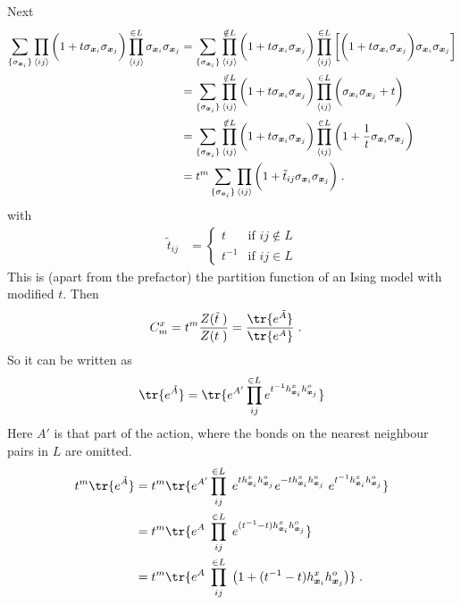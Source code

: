 Next
%
\begin{align*}
\sum_{\{\sigma_{\boldsymbol x_{i}} \}}
\prod_{\langle ij \rangle} \bigg( 1+ t \sigma_{\boldsymbol x_{i}} \sigma_{\boldsymbol x_{j}} \bigg)
\prod_{\langle ij \rangle}^{\in L}\sigma_{\boldsymbol x_{i}} \sigma_{\boldsymbol x_{j}}
&=\sum_{\{\sigma_{\boldsymbol x_{i}} \}}
\prod_{\langle ij \rangle}^{\notin L} \bigg( 1+ t \sigma_{\boldsymbol x_{i}} \sigma_{\boldsymbol x_{j}} \bigg)
\prod_{\langle ij \rangle}^{\in L}\bigg[\bigg( 1+ t \sigma_{\boldsymbol x_{i}} \sigma_{\boldsymbol x_{j}} \bigg)\sigma_{\boldsymbol x_{i}} \sigma_{\boldsymbol x_{j}}\bigg]\\
&=\sum_{\{\sigma_{\boldsymbol x_{i}} \}}
\prod_{\langle ij \rangle}^{\notin L} \bigg( 1+ t \sigma_{\boldsymbol x_{i}} \sigma_{\boldsymbol x_{j}} \bigg)
\prod_{\langle ij \rangle}^{\in L}\bigg( \sigma_{\boldsymbol x_{i}} \sigma_{\boldsymbol x_{j}} + t \bigg)\\
&=\sum_{\{\sigma_{\boldsymbol x_{i}} \}}
\prod_{\langle ij \rangle}^{\notin L}\bigg( 1+ t \sigma_{\boldsymbol x_{i}} \sigma_{\boldsymbol x_{j}} \bigg)
\prod_{\langle ij \rangle}^{\in L}\bigg(1 + \frac{1}{t} \sigma_{\boldsymbol x_{i}} \sigma_{\boldsymbol x_{j}}  \bigg)\\
&=t^{m}\sum_{\{\sigma_{\boldsymbol x_{i}} \}}
\prod_{\langle ij \rangle}\bigg( 1+ \tilde t_{ij} \sigma_{\boldsymbol x_{i}} \sigma_{\boldsymbol x_{j}} \bigg)\;.
\end{align*}
%
with
%
\begin{align*}
\tilde t_{ij}&=
\begin{cases}
	t&\text{if }  ij\notin L\\
		t^{-1}&\text{if }  ij\in L
\end{cases}
\end{align*}
%
This is (apart from the prefactor) the partition function of an Ising model with modified
$t$. Then
%
\begin{align*}
C^{x}_{m} &= t^{m} \frac{Z(\tilde t\;)}{Z(t\;)}
= \frac{\tr{ e^{\tilde A}}}{\tr{ e^{A}}}\;.
\end{align*}
%
So it can be written as
%
\begin{align*}
\tr{ e^{\tilde A}}
&=\tr{ e^{A'} \prod_{ij}^{\in L}e^{t^{-1}\hdag{\xx{i}} \hnag{\xx{j}} }}   \\
\end{align*}
%
Here $A'$ is that part of the action, where the bonds on the nearest neighbour pairs
in $L$ are omitted.
%
\begin{align*}
t^{m}\tr{ e^{\tilde A}}
&=t^{m}\tr{ e^{A'} \prod_{ij}^{\in L}\;e^{t\hdag{\xx{i}} \hnag{\xx{j}} }
e^{-t\hdag{\xx{i}} \hnag{\xx{j}} } \; 
e^{t^{-1}\hdag{\xx{i}} \hnag{\xx{j}} }}\\
&=t^{m}\tr{ e^{A}\;
\prod_{ij}^{\in L}\;e^{(t^{-1}-t)\hdag{\xx{i}} \hnag{\xx{j}} }} \\
&=t^{m}\tr{ e^{A}\;
\prod_{ij}^{\in L}\;
\big(1 + (t^{-1}-t)\hdag{\xx{i}} \hnag{\xx{j}} \big)
} \;.
\end{align*}
